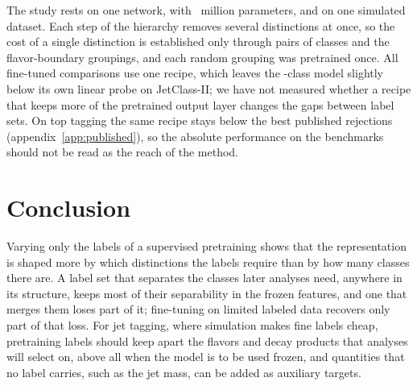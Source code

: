 The study rests on one network, with \VParamsMillion~million parameters, and on one simulated dataset.
Each step of the hierarchy removes several distinctions at once, so the cost of a single distinction is established
only through pairs of classes and the flavor-boundary groupings, and each random grouping was pretrained once.
All fine-tuned comparisons use one recipe, which leaves the \Kfull-class model slightly below its own linear probe on
JetClass-II; we have not measured whether a recipe that keeps more of the pretrained output layer changes the gaps
between label sets.
On top tagging the same recipe stays below the best published rejections (appendix~\ref{app:published}), so the
absolute performance on the benchmarks should not be read as the reach of the method.

\section{Conclusion}\label{sec:conclusion}

Varying only the labels of a supervised pretraining shows that the representation is shaped more by which distinctions
the labels require than by how many classes there are.
A label set that separates the classes later analyses need, anywhere in its structure, keeps most of their
separability in the frozen features, and one that merges them loses part of it; fine-tuning on limited labeled data
recovers only part of that loss.
For jet tagging, where simulation makes fine labels cheap, pretraining labels should keep apart the flavors and decay
products that analyses will select on, above all when the model is to be used frozen, and quantities that no label
carries, such as the jet mass, can be added as auxiliary targets.

